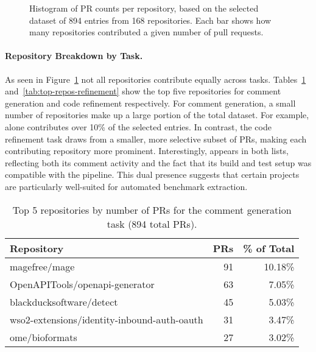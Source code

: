 \begin{figure}[ht]
	\centering
	\caption{Histogram of PR counts per repository, based on the selected dataset of 894 entries
		from 168 repositories. Each bar shows how many repositories contributed a given number of pull
		requests.}
	\label{fig:pr-dist}
\end{figure}



\paragraph{Repository Breakdown by Task.}
As seen in Figure~\ref{fig:pr-dist} not all repositories contribute equally across tasks.
Tables~\ref{tab:top-repos-comment} and~\ref{tab:top-repos-refinement} show the top five repositories
for comment generation and code refinement respectively. For comment generation, a small number of
repositories make up a large portion of the total dataset. For example,  alone
contributes over 10\% of the selected entries. In contrast, the code refinement task draws from a
smaller, more selective subset of PRs, making each contributing repository more prominent.
Interestingly,  appears in both lists, reflecting both its
comment activity and the fact that its build and test setup was compatible with the pipeline. This
dual presence suggests that certain projects are particularly well-suited for automated benchmark
extraction.

\begin{table}[ht]
	\centering
	\begin{tabular}{lrr}
		\toprule
		\textbf{Repository}                         & \textbf{PRs} & \textbf{\% of Total} \\
		\midrule
		magefree/mage                               & 91           & 10.18\%              \\
		OpenAPITools/openapi-generator              & 63           & 7.05\%               \\
		blackducksoftware/detect                    & 45           & 5.03\%               \\
		wso2-extensions/identity-inbound-auth-oauth & 31           & 3.47\%               \\
		ome/bioformats                              & 27           & 3.02\%               \\
		\bottomrule
	\end{tabular}
	\caption{Top 5 repositories by number of PRs for the comment generation task (894 total PRs).}
	\label{tab:top-repos-comment}
\end{table}


